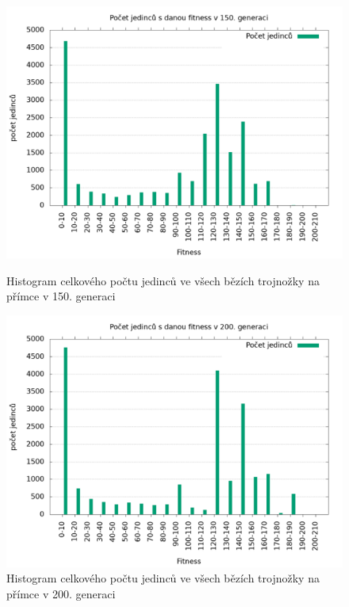 \begin{figure}[h]
    \begin{minipage}[c]{0.48\linewidth}
        \includegraphics[width=\linewidth]{obrazky/trojnozka_primka_fitnessHistogram150.png}
        \caption{Histogram celkového počtu jedinců ve všech bězích trojnožky na přímce v 150. generaci}
        \label{fig:trojnozka_primka_histogram_150}
    \end{minipage}
    \hfill
    \begin{minipage}[c]{0.48\linewidth}
        \includegraphics[width=\linewidth]{obrazky/trojnozka_primka_fitnessHistogram200.png}
        \caption{Histogram celkového počtu jedinců ve všech bězích trojnožky na přímce v 200. generaci}
        \label{fig:trojnozka_primka_histogram_200}
    \end{minipage}
\end{figure}

